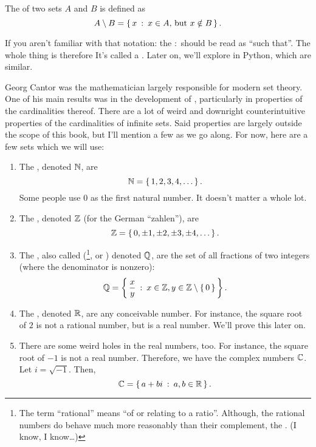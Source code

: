 \begin{definition}
  The  of two sets $A$ and $B$ is defined as
  $$A \setminus B = \left\{ \, x \::\: x \in A \text{, but } x \notin B \, \right\}.$$
\end{definition}

If you aren't familiar with that notation: the $:$ should be read as
``such that''. The whole thing is therefore  It's called a
. Later on, we'll explore  in Python, which are similar.

Georg Cantor was the mathematician largely responsible for modern set
theory. One of his main results was in the development of
, particularly in properties of the cardinalities
thereof. There are a lot of weird and downright counterintuitive
properties of the cardinalities of infinite sets. Said properties are
largely outside the scope of this book, but I'll mention a few as we
go along. For now, here are a few sets which we will use:

\begin{enumerate}
\item The , denoted $\mathbb{N}$, are $$\mathbb{N} = \left\{ \, 1, 2,
  3, 4, \dots \, \right\}.$$ Some people use $0$ as the first natural number. It
doesn't matter a whole lot.
\item The , denoted $\mathbb{Z}$ (for the German ``zahlen''),
  are $$\mathbb{Z} = \left\{ \, 0, \pm 1, \pm 2, \pm 3, \pm 4, \dots \, \right\}.$$
\item The , also called (\footnote{The term ``rational'' means ``of or relating to
    a ratio''. Although, the rational numbers do behave much more
    reasonably than their complement, the . (I know, I know\dots)}, or ) denoted
  $\mathbb{Q}$, are the set of all fractions of two integers (where the
  denominator is nonzero):
  $$\mathbb{Q} = \left\{ \, \frac{x}{y} \::\: x \in \mathbb{Z}, y \in \mathbb{Z} \setminus \left\{ \, 0 \, \right\} \, \right\}.$$
\item The , denoted $\mathbb{R}$, are any conceivable number. For
  instance, the square root of $2$ is not a rational number, but is a
  real number. We'll prove this later on.
\item There are some weird holes in the real numbers, too. For
  instance, the square root of $-1$ is not a real number. Therefore,
  we have the complex numbers $\mathbb{C}$. Let $i = \sqrt{-1}$. Then, $$\mathbb{C} =
  \left\{ \, a + bi \::\: a, b \in \mathbb{R} \, \right\}.$$
\end{enumerate}

